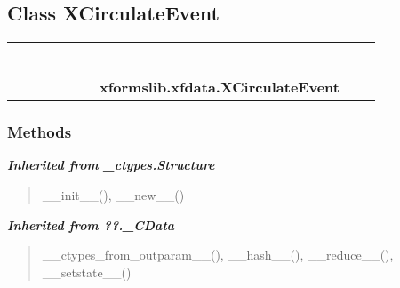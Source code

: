 
\subsection{Class XCirculateEvent}

    \label{xformslib:xfdata:XCirculateEvent}
\begin{tabular}{cccccccccc}
\multicolumn{2}{r}{\settowidth{\BCL}{object}\multirow{2}{\BCL}{object}}
&&
&&
&&
  \\\cline{3-3}
  &&\multicolumn{1}{c|}{}
&&
&&
&&
  \\
\multicolumn{4}{r}{\settowidth{\BCL}{??.\_CData}\multirow{2}{\BCL}{??.\_CData}}
&&
&&
  \\\cline{5-5}
  &&&&\multicolumn{1}{c|}{}
&&
&&
  \\
\multicolumn{6}{r}{\settowidth{\BCL}{\_ctypes.Structure}\multirow{2}{\BCL}{\_ctypes.Structure}}
&&
  \\\cline{7-7}
  &&&&&&\multicolumn{1}{c|}{}
&&
  \\
&&&&&&\multicolumn{2}{l}{\textbf{xformslib.xfdata.XCirculateEvent}}
\end{tabular}



  \subsubsection{Methods}


\large{\textbf{\textit{Inherited from \_ctypes.Structure}}}

\begin{quote}
\_\_init\_\_(), \_\_new\_\_()
\end{quote}

\large{\textbf{\textit{Inherited from ??.\_CData}}}

\begin{quote}
\_\_ctypes\_from\_outparam\_\_(), \_\_hash\_\_(), \_\_reduce\_\_(), \_\_setstate\_\_()
\end{quote}

